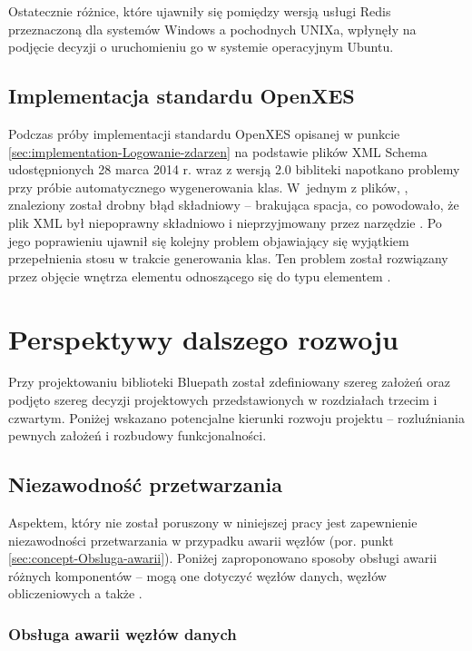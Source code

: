 Ostatecznie różnice, które ujawniły się pomiędzy wersją usługi Redis
przeznaczoną dla systemów Windows a pochodnych UNIXa, wpłynęły na
podjęcie decyzji o uruchomieniu go w systemie operacyjnym Ubuntu.


\subsection{Implementacja standardu OpenXES}

\label{sub:problemy-Implementacja-standardu-OpenXES-z-XSD}Podczas
próby implementacji standardu OpenXES opisanej w punkcie \ref{sec:implementation-Logowanie-zdarzen}
na podstawie plików XML Schema udostępnionych 28 marca 2014 r. wraz
z wersją 2.0 bibliteki napotkano problemy przy próbie automatycznego
wygenerowania klas. W~jednym z plików, , znaleziony
został drobny błąd składniowy -- brakująca spacja, co powodowało,
że plik XML był niepoprawny składniowo i nieprzyjmowany przez narzędzie
. Po jego poprawieniu ujawnił się kolejny problem
objawiający się wyjątkiem przepełnienia stosu w trakcie generowania
klas. Ten problem został rozwiązany przez objęcie wnętrza elementu
 odnoszącego się do typu 
elementem .


\section{Perspektywy dalszego rozwoju}

Przy projektowaniu biblioteki Bluepath został zdefiniowany szereg
założeń oraz podjęto szereg decyzji projektowych przedstawionych w
rozdziałach trzecim i czwartym. Poniżej wskazano potencjalne kierunki
rozwoju projektu -- rozluźniania pewnych założeń i rozbudowy funkcjonalności.


\subsection{Niezawodność przetwarzania}

\label{sub:conclusions-Obsluga-awarii}Aspektem, który nie został
poruszony w niniejszej pracy jest zapewnienie niezawodności przetwarzania
w przypadku awarii węzłów (por. punkt \ref{sec:concept-Obsluga-awarii}).
Poniżej zaproponowano sposoby obsługi awarii różnych komponentów --
mogą one dotyczyć węzłów danych, węzłów obliczeniowych a także .


\subsubsection*{Obsługa awarii węzłów danych}

